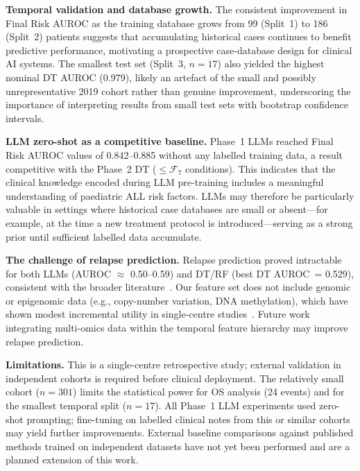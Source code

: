 \documentclass[pdflatex,sn-nature]{sn-jnl}
\begin{document}
\textbf{Temporal validation and database growth.}
The consistent improvement in Final Risk AUROC as the training
database grows from 99 (Split~1) to 186 (Split~2) patients suggests
that accumulating historical cases continues to benefit predictive
performance, motivating a prospective case-database design for
clinical AI systems.
The smallest test set (Split~3, $n=17$) also yielded the highest
nominal DT AUROC (0.979), likely an artefact of the small and
possibly unrepresentative 2019 cohort rather than genuine improvement,
underscoring the importance of interpreting results from small test
sets with bootstrap confidence intervals.

\textbf{LLM zero-shot as a competitive baseline.}
Phase~1 LLMs reached Final Risk AUROC values of 0.842--0.885 without
any labelled training data, a result competitive with the Phase~2 DT
($\leq \mathcal{F}_7$ conditions).
This indicates that the clinical knowledge encoded during LLM
pre-training includes a meaningful understanding of paediatric ALL risk
factors.
LLMs may therefore be particularly valuable in settings where
historical case databases are small or absent—for example, at the
time a new treatment protocol is introduced—serving as a strong
prior until sufficient labelled data accumulate.

\textbf{The challenge of relapse prediction.}
Relapse prediction proved intractable for both LLMs (AUROC $\approx$
0.50--0.59) and DT/RF (best DT AUROC~= 0.529), consistent with the
broader literature~\cite{[CITE:Martinez2025],[CITE:Good2018]}.
Our feature set does not include genomic or epigenomic data (e.g.,
copy-number variation, DNA methylation), which have shown modest
incremental utility in single-centre studies~\cite{[CITE:Mosquera2024]}.
Future work integrating multi-omics data within the temporal feature
hierarchy may improve relapse prediction.

\textbf{Limitations.}
This is a single-centre retrospective study; external validation in
independent cohorts is required before clinical deployment.
The relatively small cohort ($n=301$) limits the statistical power for
OS analysis (24 events) and for the smallest temporal split ($n=17$).
All Phase~1 LLM experiments used zero-shot prompting; fine-tuning on
labelled clinical notes from this or similar cohorts may yield
further improvements.
External baseline comparisons against published methods trained on
independent datasets have not yet been performed and are a planned
extension of this work.

\end{document}
